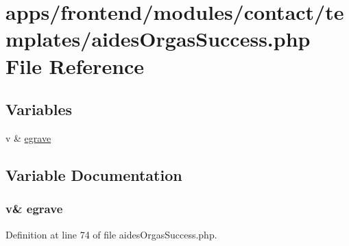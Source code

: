 \hypertarget{aides_orgas_success_8php}{\section{apps/frontend/modules/contact/templates/aides\-Orgas\-Success.php File Reference}
\label{aides_orgas_success_8php}
}
\subsection*{Variables}
\begin{DoxyCompactItemize}
\item 
v \& \hyperlink{aides_orgas_success_8php_a0b6fe8b25452531819b6130e8e048b35}{egrave}
\end{DoxyCompactItemize}


\subsection{Variable Documentation}
\hypertarget{aides_orgas_success_8php_a0b6fe8b25452531819b6130e8e048b35}{
\subsubsection[{egrave}]{\setlength{\rightskip}{0pt plus 5cm}v\& egrave}}\label{aides_orgas_success_8php_a0b6fe8b25452531819b6130e8e048b35}


Definition at line 74 of file aides\-Orgas\-Success.\-php.

